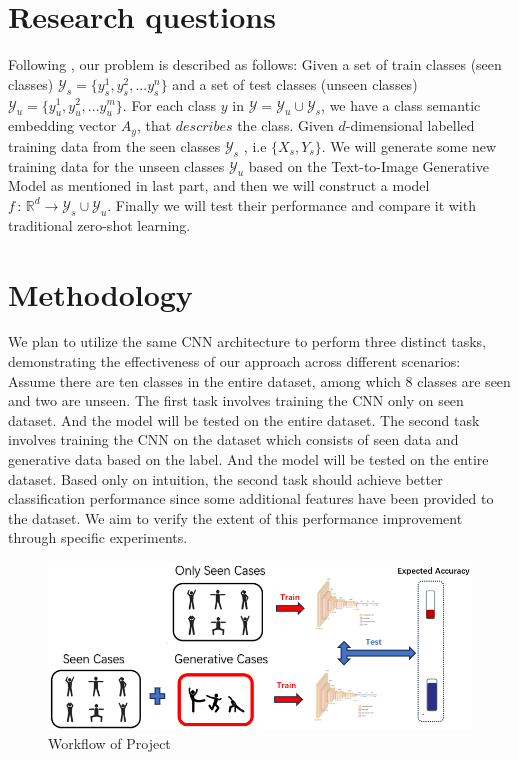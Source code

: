 \documentclass[a4paper,11pt]{scrartcl}
\begin{document}
\section{Research questions}

Following \citep{mishra2018generative}, our problem is described as follows: 
Given a set of train classes (seen classes) $\mathcal{Y}_{s}=\{y_{s}^{1},y_{s}^{2},...y_{s}^{n}\}$ and
a set of test classes (unseen classes) $\mathcal{Y}_{u}=\{y_{u}^{1},y_{u}^{2},...y_{u}^{m}\}$. 
For each class $y$ in $\mathcal{Y}=\mathcal{Y}_{u}\cup\mathcal{Y}_{s}$,
we have a class semantic embedding vector $A_{y}$, that $\textit{describes}$
the class. Given $d$-dimensional labelled training data from
the seen classes $\mathcal{Y}_{s}$ , i.e $\{X_{s},Y_{s}\}$. We will generate some new training data for the 
unseen classes $\mathcal{Y}_{u}$ based on the Text-to-Image Generative Model as mentioned in last part, and then we will construct a model $f\,:\,\mathbb{R}^{d}\rightarrow\mathcal{Y}_{s}\cup\mathcal{Y}_{u}$.
Finally we will test their performance and compare it with traditional zero-shot learning.
 
\section{Methodology}
We plan to utilize the same CNN architecture to perform three distinct tasks,
demonstrating the effectiveness of our approach across different scenarios:
Assume there are ten classes in the entire dataset, among which 8 classes are seen and two are unseen.
The first task involves training the CNN only on seen dataset.
And the model will be tested on the entire dataset. 
The second task involves training the CNN on the dataset which consists of seen data and generative data based on the label.
And the model will be tested on the entire dataset.
Based only on intuition,
the second task should achieve better classification 
performance since some additional features have been provided to the dataset. 
We aim to verify the extent of this performance improvement through specific experiments.
\begin{figure}[htbp]
  \centering
  \includegraphics[width=1\textwidth]{pro.png}
  \caption{Workflow of Project}
  \label{fig:image1}
  \end{figure}
\end{document}
